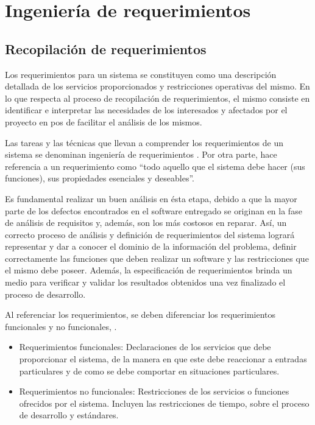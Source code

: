 \chapter{Ingeniería de requerimientos}
\label{CapituloRequerimientos}
\section{Recopilación de requerimientos}
    \par
    Los requerimientos para un sistema se constituyen como una descripción detallada de los servicios proporcionados y restricciones operativas del mismo. En lo que respecta al proceso de recopilación de requerimientos, el mismo consiste en identificar e interpretar las necesidades de los interesados y afectados por el proyecto en pos de facilitar el análisis de los mismos.
    
    \par
    Las tareas y las técnicas que llevan a comprender los requerimientos de un sistema se denominan ingeniería de requerimientos \cite{Press10}. Por otra parte, \cite{Som05} hace referencia a un requerimiento como ``todo aquello que el sistema debe hacer (sus funciones), sus propiedades esenciales y deseables''.
    
    \par
    Es fundamental realizar un buen análisis en ésta etapa, debido a que la mayor parte de los defectos encontrados en el software entregado se originan en la fase de análisis de requisitos y, además, son los más costosos en reparar. Así, un correcto proceso de análisis y definición de requerimientos del sistema logrará representar y dar a conocer el dominio de la información del problema, definir correctamente las funciones que deben realizar un software y las restricciones que el mismo debe poseer. Además, la especificación de requerimientos brinda un medio para verificar y validar los resultados obtenidos una vez finalizado el proceso de desarrollo.
    
    \par
    Al referenciar los requerimientos, se deben diferenciar los requerimientos funcionales y no funcionales, \cite{Som05}.\\
    \begin{itemize}
        \item Requerimientos funcionales: Declaraciones de los servicios que debe proporcionar el sistema, de la manera en que este debe reaccionar a entradas particulares y de como se debe comportar en situaciones particulares.
        
        \item Requerimientos no funcionales: Restricciones de los servicios o funciones ofrecidos por el sistema. Incluyen las restricciones de tiempo, sobre el proceso de desarrollo y estándares.
    \end{itemize}
